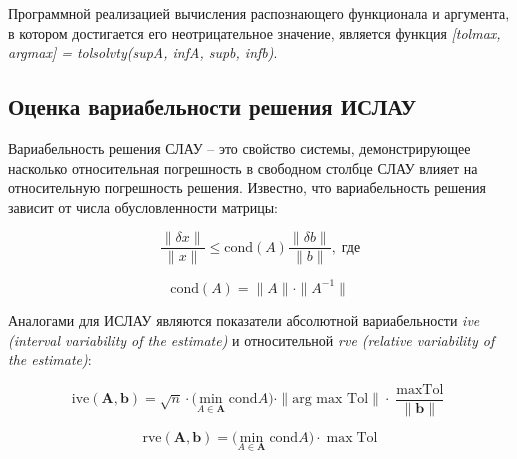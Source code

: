 Программной реализацией вычисления распознающего функционала и аргумента, в котором достигается его неотрицательное значение, является функция \textit{[tolmax, argmax] = tolsolvty(supA, infA, supb, infb)}.

\subsection{Оценка вариабельности решения ИСЛАУ}

Вариабельность решения СЛАУ -- это свойство системы, демонстрирующее насколько относительная погрешность в свободном столбце СЛАУ влияет на относительную погрешность решения. Известно, что вариабельность решения зависит от числа обусловленности матрицы:

\begin{equation}
\frac{\|\delta x\|}{\|x\|} \leq \textrm{cond}(A) \frac{\|\delta b\|}{\|b\|}, \; \text{где}
\end{equation}

\begin{equation}
\textrm{cond}(A) = \|A\| \cdot \|A^{-1}\|
\end{equation}

Аналогами для ИСЛАУ являются показатели абсолютной вариабельности \textit{ive (interval variability of the estimate)} и относительной \textit{rve (relative variability of the estimate)}:

\begin{equation}
\textrm{ive}(\mathbf{A}, \mathbf{b}) = \sqrt{n} \cdot \bigg(\underset{A \in \mathbf{A}}{\textrm{min}} \; \textrm{cond} A \bigg) \cdot \| \textrm{arg max Tol}\| \cdot \frac{\max \textrm{Tol}}{\|\mathbf{b}\|}
\end{equation}

\begin{equation}
\textrm{rve}(\mathbf{A}, \mathbf{b}) = \bigg(\underset{A \in \mathbf{A}}{\textrm{min}} \; \textrm{cond} A \bigg) \cdot \max \textrm{Tol}	
\end{equation}